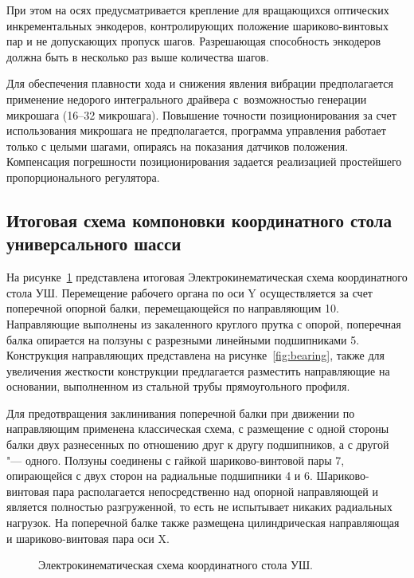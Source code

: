 При этом на осях предусматривается крепление для вращающихся оптических инкрементальных энкодеров, контролирующих положение шариково-винтовых пар и не допускающих пропуск шагов. Разрешающая способность энкодеров должна быть в несколько раз выше количества шагов.

Для обеспечения плавности хода и снижения явления вибрации предполагается применение недорого интегрального драйвера с~возможностью генерации микрошага (16--32 микрошага). Повышение точности позиционирования за счет использования микрошага не предполагается, программа управления работает только с целыми шагами, опираясь на показания датчиков положения. Компенсация погрешности позиционирования задается реализацией простейшего пропорционального регулятора.

\subsection{Итоговая схема компоновки координатного стола универсального шасси}

На рисунке~\cref{fig:scheme} представлена итоговая Электрокинематическая схема координатного стола УШ. Перемещение рабочего органа по оси Y осуществляется за счет поперечной опорной балки, перемещающейся по направляющим 10. Направляющие выполнены из закаленного круглого прутка с опорой, поперечная балка опирается на ползуны с разрезными линейными подшипниками 5. Конструкция направляющих представлена на рисунке~\cref{fig:bearing}, также для увеличения жесткости конструкции предлагается разместить направляющие на основании, выполненном из стальной трубы прямоугольного профиля.

Для предотвращения заклинивания поперечной балки при движении по направляющим применена классическая схема, с размещение с одной стороны балки двух разнесенных по отношению друг к другу подшипников, а с другой "--- одного. Ползуны соединены с гайкой шариково-винтовой пары 7, опирающейся с двух сторон на радиальные подшипники 4 и 6. Шариково-винтовая пара располагается непосредственно над опорной направляющей и является полностью разгруженной, то есть не испытывает никаких радиальных нагрузок. На поперечной балке также размещена цилиндрическая направляющая и шариково-винтовая пара оси X.

\begin{figure}[ht]
	\caption{Электрокинематическая схема координатного стола УШ.}\label{fig:scheme}
\end{figure}

